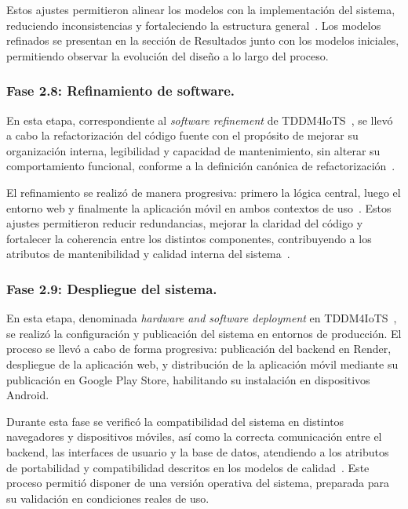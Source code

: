 					Estos ajustes permitieron alinear los modelos con la implementación del sistema, reduciendo inconsistencias y fortaleciendo la estructura general~\cite{Fowler2002}. Los modelos refinados se presentan en la sección de Resultados junto con los modelos iniciales, permitiendo observar la evolución del diseño a lo largo del proceso.
					
				\subsubsection{Fase 2.8: Refinamiento de software.}
					En esta etapa, correspondiente al \textit{software refinement} de TDDM4IoTS~\cite{GuerreroUlloa2024}, se llevó a cabo la refactorización del código fuente con el propósito de mejorar su organización interna, legibilidad y capacidad de mantenimiento, sin alterar su comportamiento funcional, conforme a la definición canónica de refactorización~\cite{Fowler2002}.
					
					El refinamiento se realizó de manera progresiva: primero la lógica central, luego el entorno web y finalmente la aplicación móvil en ambos contextos de uso~\cite{GuerreroUlloa2024}. Estos ajustes permitieron reducir redundancias, mejorar la claridad del código y fortalecer la coherencia entre los distintos componentes, contribuyendo a los atributos de mantenibilidad y calidad interna del sistema~\cite{Fowler2002,Kleppmann2017}.
					
				\subsubsection{Fase 2.9: Despliegue del sistema.}
					En esta etapa, denominada \textit{hardware and software deployment} en TDDM4IoTS~\cite{GuerreroUlloa2024}, se realizó la configuración y publicación del sistema en entornos de producción. El proceso se llevó a cabo de forma progresiva: publicación del backend en Render, despliegue de la aplicación web, y distribución de la aplicación móvil mediante su publicación en Google Play Store, habilitando su instalación en dispositivos Android.
					
					Durante esta fase se verificó la compatibilidad del sistema en distintos navegadores y dispositivos móviles, así como la correcta comunicación entre el backend, las interfaces de usuario y la base de datos, atendiendo a los atributos de portabilidad y compatibilidad descritos en los modelos de calidad~\cite{GuerreroUlloa2024}. Este proceso permitió disponer de una versión operativa del sistema, preparada para su validación en condiciones reales de uso.
					
